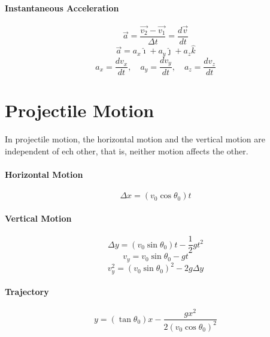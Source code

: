 \documentclass{article}
\begin{document}
        \paragraph{Instantaneous Acceleration}
        \begin{equation}
            \vec{a} = \frac{\vec{v_2} - \vec{v_1}}{\Delta t} = \frac{d\vec{v}}{dt}
        \end{equation}
        \begin{equation}
            \vec{a} = a_x \hat{\imath} + a_y \hat{\jmath} + a_z \hat{k}
        \end{equation}
        \begin{equation}
            a_x = \frac{dv_x}{dt}, \quad a_y = \frac{dv_y}{dt}, \quad a_z = \frac{dv_z}{dt}
        \end{equation}

    \section{Projectile Motion}

        In projectile motion, the horizontal motion and the vertical motion are independent of ech other, that is, neither motion affects the other.

        \paragraph{Horizontal Motion}
        \begin{equation}
            \Delta x = \left( v_0 \cos{\theta_0} \right) t
        \end{equation}

        \paragraph{Vertical Motion}
        \begin{equation}
            \Delta y = \left( v_0 \sin{\theta_0} \right) t - \frac{1}{2} g t^2
        \end{equation}
        \begin{equation}
            v_y = v_0 \sin{\theta_0} - g t
        \end{equation}
        \begin{equation}
            v_y^2 = \left( v_0 \sin{\theta_0} \right)^2 - 2 g \Delta y
        \end{equation}

        \paragraph{Trajectory}
        \begin{equation}
            y = \left(\tan{\theta_0}\right) x - \frac{gx^2}{2\left(v_0\cos{\theta_0}\right)^2}
        \end{equation}
\end{document}
